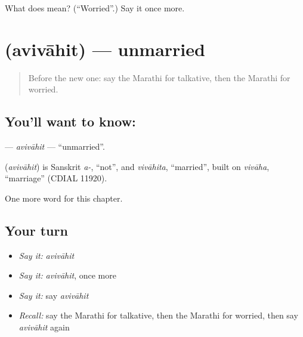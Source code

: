 \begin{tcolorbox}[breakable,colback=teal!4,colframe=teal!35!black,title={Before you move on}]
What does  mean? (\textquotedblleft{}Worried\textquotedblright{}.) Say it once more.
\end{tcolorbox}
\section[\texorpdfstring{\mr{अविवाहित} (avivāhit)}{अविवाहित (avivāhit)}]{ (avivāhit) — unmarried}

\label{lesson:MR-C260-avivahit}



\begin{quote}
Before the new one: say the Marathi for talkative, then the Marathi for worried.
\end{quote}

\subsection*{You'll want to know: }
\textbf{} — \emph{avivāhit} — \textquotedblleft{}unmarried\textquotedblright{}.

\begin{cousinweb}
\textbf{} (\emph{avivāhit}) is Sanskrit \emph{a-}, \textquotedblleft{}not\textquotedblright{}, and \emph{vivāhita}, \textquotedblleft{}married\textquotedblright{}, built on \emph{vivāha}, \textquotedblleft{}marriage\textquotedblright{} (CDIAL 11920).
\end{cousinweb}

\begin{grammarlens}[title={What you've built}]
One more word for this chapter.
\end{grammarlens}

\subsection*{Your turn}
\begin{itemize}
\raggedright
  \item \emph{Say it:} \emph{avivāhit}
  \item \emph{Say it:} \emph{avivāhit}, once more
  \item \emph{Say it:} say \emph{avivāhit}
  \item \emph{Recall:} say the Marathi for talkative, then the Marathi for worried, then say \emph{avivāhit} again
\end{itemize}

